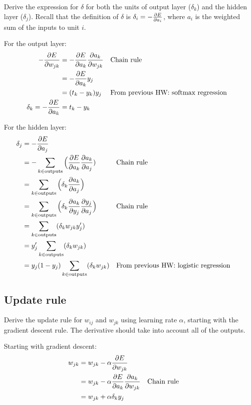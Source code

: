 \documentclass{article} %
\begin{document}
Derive the expression for $\delta$ for both the units of output layer
($\delta_k$) and the hidden layer ($\delta_j$). Recall that the definition of
$\delta$ is $\delta_i = -\pdv{E}{a_i}$, where $a_i$ is the weighted sum of the
inputs to unit $i$.

For the output layer:
%
\begin{align}
  - \pdv{E}{w_{jk}} &= - \pdv{E}{a_k} \pdv{a_k}{w_{jk}}
  && \text{Chain rule}\\
  &= - \pdv{E}{a_k} y_j\\
  &= (t_k - y_k) y_j
  && \text{From previous HW: softmax regression}\\
  \delta_k = - \pdv{E}{a_k} &= t_k - y_k
\end{align}

For the hidden layer:
%
\begin{align}
  \delta_j
  &= - \pdv{E}{a_j}\\
  &= - \sum_{k \in \text{outputs}} \Big(\pdv{E}{a_k} \pdv{a_k}{a_j})
  && \text{Chain rule}\\
  &= \sum_{k \in \text{outputs}} \Big(\delta_k \pdv{a_k}{a_j}\Big)\\
  &= \sum_{k \in \text{outputs}} \Big(\delta_k \pdv{a_k}{y_j} \pdv{y_j}{a_j}\Big)
  && \text{Chain rule}\\
  &= \sum_{k \in \text{outputs}} (\delta_k w_{jk} y_j')\\
  &= y_j' \sum_{k \in \text{outputs}} (\delta_k w_{jk})\\
  &= y_j (1 - y_j) \sum_{k \in \text{outputs}} (\delta_k w_{jk})
  && \text{From previous HW: logistic regression}
\end{align}

\subsection{Update rule}

Derive the update rule for $w_{ij}$ and $w_{jk}$ using learning rate $\alpha$,
starting with the gradient descent rule. The derivative should take into account
all of the outputs.

Starting with gradient descent:
%
\begin{align}
  w_{jk}
  &= w_{jk} - \alpha \pdv{E}{w_{jk}}\\
  &= w_{jk} - \alpha \pdv{E}{a_k} \pdv{a_k}{w_{jk}}
  && \text{Chain rule}\\
  &= w_{jk} + \alpha \delta_k y_j
\end{align}
\end{document}
